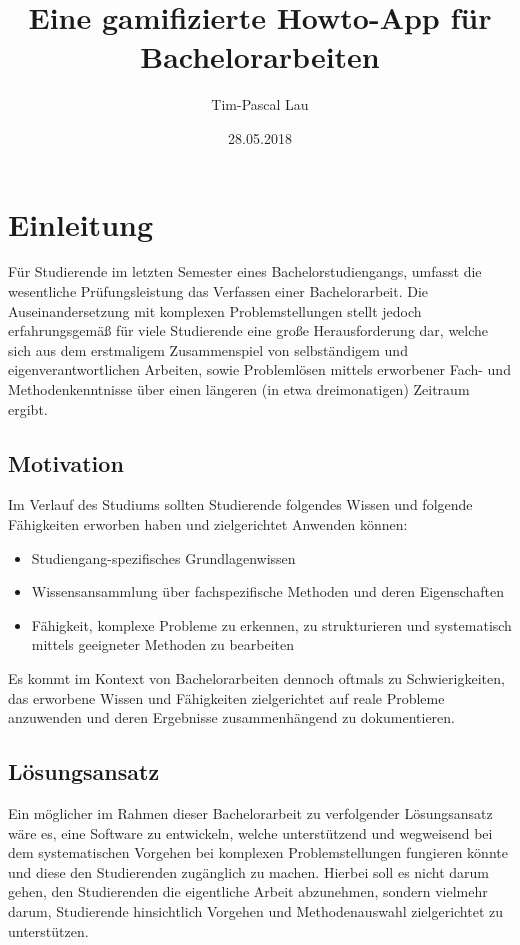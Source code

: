 \documentclass{scrreprt}
\title{Eine gamifizierte Howto-App für Bachelorarbeiten}
\author{Tim-Pascal Lau}
\date{28.05.2018}
\begin{document}
\maketitle
\tableofcontents
\listoftables
\listoffigures

\chapter{Einleitung}
Für Studierende im letzten Semester eines Bachelorstudiengangs, umfasst die wesentliche Prüfungsleistung das Verfassen einer Bachelorarbeit.
Die Auseinandersetzung mit komplexen Problemstellungen stellt jedoch erfahrungsgemäß für viele Studierende eine große Herausforderung dar, welche sich aus dem erstmaligem Zusammenspiel von selbständigem und eigenverantwortlichen Arbeiten, sowie Problemlösen mittels erworbener Fach- und Methodenkenntnisse über einen längeren (in etwa dreimonatigen) Zeitraum ergibt.

\section{Motivation}
Im Verlauf des Studiums sollten Studierende folgendes Wissen und folgende Fähigkeiten erworben haben und zielgerichtet Anwenden können:
\begin{itemize}
\item Studiengang-spezifisches Grundlagenwissen
\item Wissensansammlung über fachspezifische Methoden und deren Eigenschaften
\item Fähigkeit, komplexe Probleme zu erkennen, zu strukturieren und systematisch mittels geeigneter Methoden zu bearbeiten
\end{itemize}
Es kommt im Kontext von Bachelorarbeiten dennoch oftmals zu Schwierigkeiten, das erworbene Wissen und Fähigkeiten zielgerichtet auf reale Probleme anzuwenden und deren Ergebnisse zusammenhängend zu dokumentieren.

\section{Lösungsansatz}
Ein möglicher im Rahmen dieser Bachelorarbeit zu verfolgender Lösungsansatz wäre es, eine Software zu entwickeln, welche unterstützend und wegweisend bei dem systematischen Vorgehen bei komplexen Problemstellungen fungieren könnte und diese den Studierenden zugänglich zu machen.
Hierbei soll es nicht darum gehen, den Studierenden die eigentliche Arbeit abzunehmen, sondern vielmehr darum, Studierende hinsichtlich Vorgehen und Methodenauswahl zielgerichtet zu unterstützen.
\end{document}
